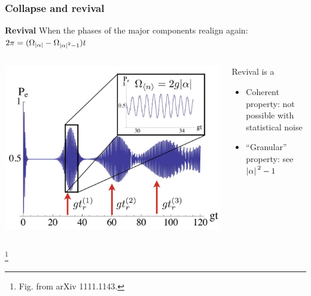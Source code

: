 \documentclass[t]{beamer}
\newcommand\blfootnote[1]{%
\begingroup
\renewcommand\thefootnote{}\footnote{#1}%
\addtocounter{footnote}{-1}%
\endgroup
}
\begin{document}
\begin{frame}
\frametitle{Collapse and revival}

\textbf{Revival} When the phases of the major components realign again: $2\pi = (\Omega_{\abs*{\alpha}} - \Omega_{\abs*{\alpha}^2 - 1}) t$

\begin{columns}[T]
    \begin{column}{0.6\textwidth}
        \begin{center}
            \includegraphics[width=\textwidth]{figs/collapse-revival.PNG}
    \end{center}
    \end{column}
    \begin{column}{0.4\textwidth}
        Revival is a
        \begin{itemize}
            \item Coherent property: not possible with statistical noise 
            \item ``Granular'' property: see $\abs*{\alpha}^2-1$ 
        \end{itemize} 
    \end{column}
\end{columns}

\blfootnote{Fig. from arXiv 1111.1143.}

\end{frame}
\end{document}

